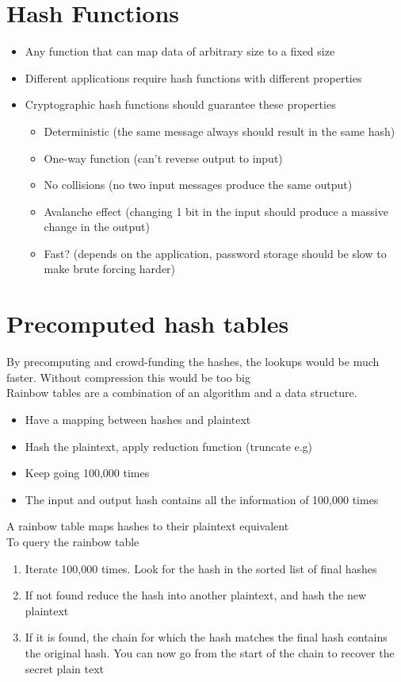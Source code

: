 \documentclass{article}[18pt]
\begin{document}
\section{Hash Functions}
\begin{itemize}
	\item Any function that can map data of arbitrary size to a fixed size
	\item Different applications require hash functions with different properties
	\item Cryptographic hash functions should guarantee these properties
	\begin{itemize}
		\item Deterministic (the same message always should result in the same hash)
		\item One-way function (can't reverse output to input)
		\item No collisions (no two input messages produce the same output)
		\item Avalanche effect (changing 1 bit in the input should produce a massive change in the output)
		\item Fast? (depends on the application, password storage should be slow to make brute forcing harder)
	\end{itemize}
\end{itemize}

\section{Precomputed hash tables}
By precomputing and crowd-funding the hashes, the lookups would be much faster. Without compression this would be too big\\
Rainbow tables are a combination of an algorithm and a data structure.
\begin{itemize}
	\item Have a mapping between hashes and plaintext
	\item Hash the plaintext, apply reduction function (truncate e.g)
	\item Keep going 100,000 times
	\item The input and output hash contains all the information of 100,000 times
\end{itemize}
A rainbow table maps hashes to their plaintext equivalent\\
To query the rainbow table
\begin{enumerate}
	\item Iterate 100,000 times. Look for the hash in the sorted list of final hashes
	\item If not found reduce the hash into another plaintext, and hash the new plaintext
	\item If it is found, the chain for which the hash matches the final hash contains the original hash. You can now go from the start of the chain to recover the secret plain text
\end{enumerate}
\end{document}
